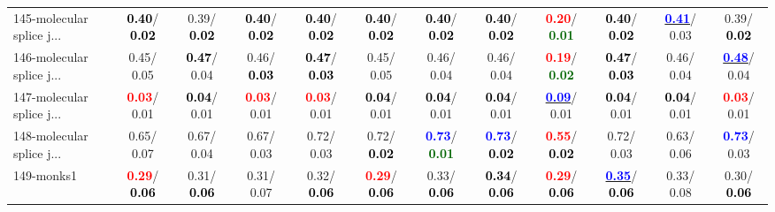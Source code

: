 \begin{table}[h]
\begin{center}
{\begin{tabular}{lc|c|c|c|c|c|c|c|c|c|c}
145-molecular splice j... & \textcolor{black}{\textbf{  0.40}}/\textcolor{black}{\textbf{  0.02}} &   0.39/\textcolor{black}{\textbf{  0.02}} & \textcolor{black}{\textbf{  0.40}}/\textcolor{black}{\textbf{  0.02}} & \textcolor{black}{\textbf{  0.40}}/\textcolor{black}{\textbf{  0.02}} & \textcolor{black}{\textbf{  0.40}}/\textcolor{black}{\textbf{  0.02}} & \textcolor{black}{\textbf{  0.40}}/\textcolor{black}{\textbf{  0.02}} & \textcolor{black}{\textbf{  0.40}}/\textcolor{black}{\textbf{  0.02}} & \textcolor{red}{\textbf{  0.20}}/\textcolor{darkgreen}{\textbf{  0.01}} & \textcolor{black}{\textbf{  0.40}}/\textcolor{black}{\textbf{  0.02}} & \underline{\textcolor{blue}{\textbf{  0.41}}}/  0.03 &   0.39/\textcolor{black}{\textbf{  0.02}} \\
146-molecular splice j... &   0.45/  0.05 & \textcolor{black}{\textbf{  0.47}}/  0.04 &   0.46/\textcolor{black}{\textbf{  0.03}} & \textcolor{black}{\textbf{  0.47}}/\textcolor{black}{\textbf{  0.03}} &   0.45/  0.05 &   0.46/  0.04 &   0.46/  0.04 & \textcolor{red}{\textbf{  0.19}}/\textcolor{darkgreen}{\textbf{  0.02}} & \textcolor{black}{\textbf{  0.47}}/\textcolor{black}{\textbf{  0.03}} &   0.46/  0.04 & \underline{\textcolor{blue}{\textbf{  0.48}}}/  0.04 \\
147-molecular splice j... & \textcolor{red}{\textbf{  0.03}}/  0.01 & \textcolor{black}{\textbf{  0.04}}/  0.01 & \textcolor{red}{\textbf{  0.03}}/  0.01 & \textcolor{red}{\textbf{  0.03}}/  0.01 & \textcolor{black}{\textbf{  0.04}}/  0.01 & \textcolor{black}{\textbf{  0.04}}/  0.01 & \textcolor{black}{\textbf{  0.04}}/  0.01 & \underline{\textcolor{blue}{\textbf{  0.09}}}/  0.01 & \textcolor{black}{\textbf{  0.04}}/  0.01 & \textcolor{black}{\textbf{  0.04}}/  0.01 & \textcolor{red}{\textbf{  0.03}}/  0.01 \\
148-molecular splice j... &   0.65/  0.07 &   0.67/  0.04 &   0.67/  0.03 &   0.72/  0.03 &   0.72/\textcolor{black}{\textbf{  0.02}} & \textcolor{blue}{\textbf{  0.73}}/\textcolor{darkgreen}{\textbf{  0.01}} & \textcolor{blue}{\textbf{  0.73}}/\textcolor{black}{\textbf{  0.02}} & \textcolor{red}{\textbf{  0.55}}/\textcolor{black}{\textbf{  0.02}} &   0.72/  0.03 &   0.63/  0.06 & \textcolor{blue}{\textbf{  0.73}}/  0.03 \\
149-monks1 & \textcolor{red}{\textbf{  0.29}}/\textcolor{black}{\textbf{  0.06}} &   0.31/\textcolor{black}{\textbf{  0.06}} &   0.31/  0.07 &   0.32/\textcolor{black}{\textbf{  0.06}} & \textcolor{red}{\textbf{  0.29}}/\textcolor{black}{\textbf{  0.06}} &   0.33/\textcolor{black}{\textbf{  0.06}} & \textcolor{black}{\textbf{  0.34}}/\textcolor{black}{\textbf{  0.06}} & \textcolor{red}{\textbf{  0.29}}/\textcolor{black}{\textbf{  0.06}} & \underline{\textcolor{blue}{\textbf{  0.35}}}/\textcolor{black}{\textbf{  0.06}} &   0.33/  0.08 &   0.30/\textcolor{black}{\textbf{  0.06}} \\ \hline

\end{tabular}}
\end{center}
\end{table}
